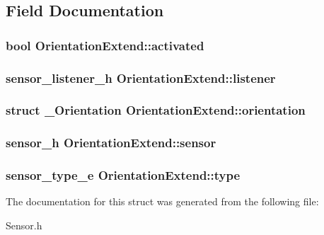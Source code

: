 \subsection{Field Documentation}
\subsubsection[{activated}]{\setlength{\rightskip}{0pt plus 5cm}bool Orientation\-Extend\-::activated}\label{structOrientationExtend_a6baf56fb0bd047c1d0ee3d80b39dca90}
\subsubsection[{listener}]{\setlength{\rightskip}{0pt plus 5cm}sensor\-\_\-listener\-\_\-h Orientation\-Extend\-::listener}\label{structOrientationExtend_abf84ed65ce21492028f509eaa073ffe7}
\subsubsection[{orientation}]{\setlength{\rightskip}{0pt plus 5cm}struct {\bf \-\_\-\-Orientation} Orientation\-Extend\-::orientation}\label{structOrientationExtend_a57bb5f6c7de1ecd602d7271d06ccd8c4}
\subsubsection[{sensor}]{\setlength{\rightskip}{0pt plus 5cm}sensor\-\_\-h Orientation\-Extend\-::sensor}\label{structOrientationExtend_a81c95455a5ad93feb7282dabce09b097}
\subsubsection[{type}]{\setlength{\rightskip}{0pt plus 5cm}sensor\-\_\-type\-\_\-e Orientation\-Extend\-::type}\label{structOrientationExtend_a813b31522d8267a821b55b543fc315ee}


The documentation for this struct was generated from the following file\-:\begin{DoxyCompactItemize}
\item 
Sensor.\-h\end{DoxyCompactItemize}
